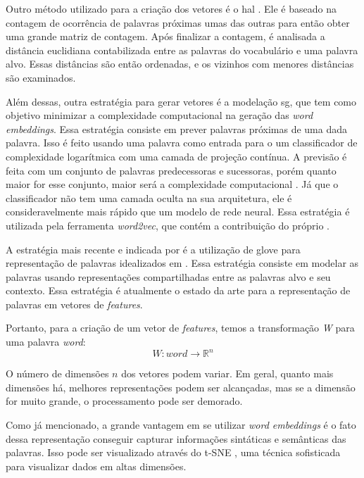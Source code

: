 Outro método utilizado para a criação dos vetores é o \ac{hal} \cite{lund1996producing}. Ele é baseado na contagem de ocorrência de palavras próximas umas das outras para então obter uma grande matriz de contagem. Após finalizar a contagem, é analisada a distância euclidiana contabilizada entre as palavras do vocabulário e uma palavra alvo. Essas distâncias são então ordenadas, e os vizinhos com menores distâncias são examinados.

Além dessas, outra estratégia para gerar vetores é a modelação \ac{sg}, que tem como objetivo minimizar a complexidade computacional na geração das \textit{word embeddings}. Essa estratégia consiste em prever palavras próximas de uma dada palavra. Isso é feito usando uma palavra como entrada para o um classificador de complexidade logarítmica com uma camada de projeção contínua. A previsão é feita com um conjunto de palavras predecessoras e sucessoras, porém quanto maior for esse conjunto, maior será a complexidade computacional \cite{mikolov2013efficient}. Já que o classificador não tem uma camada oculta na sua arquitetura, ele é consideravelmente mais rápido que um modelo de rede neural. Essa estratégia é utilizada pela ferramenta \textit{word2vec}, que contém a contribuição do próprio .

A estratégia mais recente e indicada por  é a utilização de \ac{glove} para representação de palavras idealizados em \cite{pennington2014glove}. Essa estratégia consiste em modelar as palavras usando representações compartilhadas entre as palavras alvo e seu contexto. Essa estratégia é atualmente o estado da arte para a representação de palavras em vetores de \textit{features}.

Portanto, para a criação de um vetor de \textit{features}, temos a transformação \textit{W} para uma palavra \textit{word}:
\begin{equation}
W:word \to \mathbb{R}^n
\end{equation}

O número de dimensões $n$ dos vetores podem variar. Em geral, quanto mais dimensões há, melhores representações podem ser alcançadas, mas se a dimensão for muito grande, o processamento pode ser demorado.

Como já mencionado, a grande vantagem em se utilizar \textit{word embeddings} é o fato dessa representação conseguir capturar informações sintáticas e semânticas das palavras. Isso pode ser visualizado através do t-SNE \cite{van2008visualizing}, uma técnica sofisticada para visualizar dados em altas dimensões.

